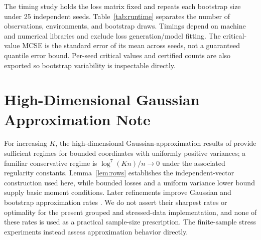 \documentclass[twoside,11pt]{article}
\begin{document}
The timing study holds the loss matrix fixed and repeats each bootstrap size under 25
independent seeds. Table~\ref{tab:runtime} separates the number of observations, environments,
and bootstrap draws. Timings depend on machine and numerical libraries and exclude loss
generation/model fitting. The critical-value MCSE is the standard error of its mean across
seeds, not a guaranteed quantile error bound. Per-seed critical values and certified counts
are also exported so bootstrap variability is inspectable directly.
\begin{table}[ht]
\centering\small
\caption{Conditional-covariance multiplier timing and variability.}
\label{tab:runtime}
\end{table}

\section{High-Dimensional Gaussian Approximation Note}
\label{app:highdim}
For increasing $K$, the high-dimensional Gaussian-approximation results of
\citet{chernozhukov2013gaussian} provide sufficient regimes for bounded coordinates with
uniformly positive variances; a familiar conservative regime is
$\log^7(Kn)/n\to0$ under the associated regularity constants. Lemma~\ref{lem:rows}
establishes the independent-vector construction used here, while bounded losses and a uniform
variance lower bound supply basic moment conditions. Later refinements improve Gaussian and
bootstrap approximation rates \citep{cckk2022}. We do not assert their sharpest rates or
optimality for the present grouped and stressed-data implementation, and none of these rates is
used as a practical sample-size prescription. The finite-sample stress experiments instead
assess approximation behavior directly.
\end{document}
